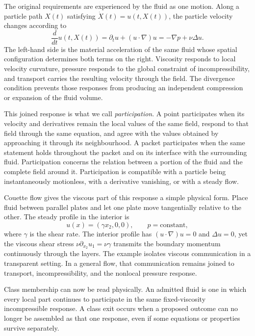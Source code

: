 The original requirements are experienced by the fluid as one motion.
Along a particle path \(X(t)\) satisfying \(\dot X(t)=u(t,X(t))\), the particle velocity changes according to
\[
  \frac{d}{dt}u(t,X(t))
  =
  \partial_tu+(u\cdot\nabla)u
  =
  -\nabla p+\nu\Delta u.
\]
The left-hand side is the material acceleration of the same fluid whose spatial configuration determines both terms on the right.
Viscosity responds to local velocity curvature, pressure responds to the global constraint of incompressibility, and transport carries the resulting velocity through the field.
The divergence condition prevents those responses from producing an independent compression or expansion of the fluid volume.

This joined response is what we call \emph{participation}.
A point participates when its velocity and derivatives remain the local values of the same field, respond to that field through the same equation, and agree with the values obtained by approaching it through its neighbourhood.
A packet participates when the same statement holds throughout the packet and on its interface with the surrounding fluid.
Participation concerns the relation between a portion of the fluid and the complete field around it.
Participation is compatible with a particle being instantaneously motionless, with a derivative vanishing, or with a steady flow.

Couette flow gives the viscous part of this response a simple physical form.
Place fluid between parallel plates and let one plate move tangentially relative to the other.
The steady profile in the interior is
\[
  u(x)=(\gamma x_2,0,0),
  \qquad
  p=\text{constant},
\]
where \(\gamma\) is the shear rate.
The interior profile has \((u\cdot\nabla)u=0\) and \(\Delta u=0\), yet the viscous shear stress \(\nu\partial_{x_2}u_1=\nu\gamma\) transmits the boundary momentum continuously through the layers.
The example isolates viscous communication in a transparent setting.
In a general flow, that communication remains joined to transport, incompressibility, and the nonlocal pressure response.

Class membership can now be read physically.
An admitted fluid is one in which every local part continues to participate in the same fixed-viscosity incompressible response.
A class exit occurs when a proposed outcome can no longer be assembled as that one response, even if some equations or properties survive separately.
